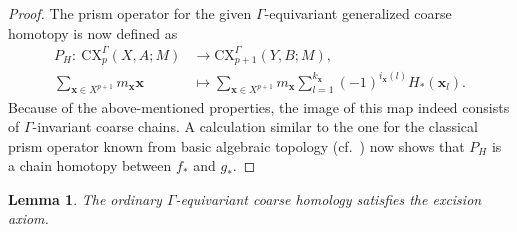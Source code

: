 \documentclass[pdftex]{sigma}
\numberwithin{equation}{section}
\newtheorem{lem}[thm]{Lemma}
\theoremstyle{definition}
\newcommand{\CX}{\mathrm{CX}}
\begin{document}
\begin{proof}
The prism operator for the given $\Gamma$-equivariant generalized coarse homotopy is now defined as
\begin{align*}
P_H\colon\ \CX^\Gamma_p(X,A;M)&\to \CX^\Gamma_{p+1}(Y,B;M),
\\
\sum_{\mathbf{x}\in X^{p+1}}m_{\mathbf{x}}\mathbf{x}&\mapsto \sum_{\mathbf{x}\in X^{p+1}}m_{\mathbf{x}}\sum_{l=1}^{k_\mathbf{x}}(-1)^{i_\mathbf{x}(l)}H_*(\mathbf{x}_l).
\end{align*}
Because of the above-mentioned properties, the image of this map indeed consists of $\Gamma$-invariant coarse chains. A calculation similar to the one for the classical prism operator known from basic algebraic topology (cf.\ \cite[proof of Theorem 2.10]{Hatcher_AT}) now shows that $P_H$ is a chain homotopy between $f_*$ and $g_*$.
\end{proof}

\begin{lem}
The ordinary $\Gamma$-equivariant coarse homology satisfies the excision axiom.
\end{lem}
\end{document}

